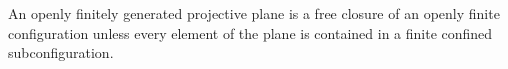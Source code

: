 An openly finitely generated projective plane is a free closure of an openly finite configuration unless every element of the plane is contained in a finite confined subconfiguration.
